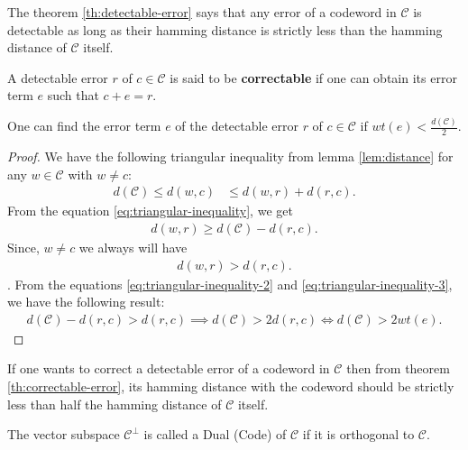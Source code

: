 The theorem \ref{th:detectable-error} says that any error of a codeword in $\mathcal{C}$ is 
detectable as long as their hamming distance is strictly less than the hamming distance of
$\mathcal{C}$ itself.

\begin{definition}
  A detectable error $r$ of $c\in\mathcal{C}$ is said to be \textbf{correctable} if one can obtain its 
  error term $e$ such that $c+e=r$.
\end{definition}

\begin{theorem}\cite{gallian2024contemporary}\label{th:correctable-error}
  One can find the error term $e$ of the detectable error $r$ of $c\in\mathcal{C}$ if 
  $wt(e)<\frac{d(\mathcal{C})}{2}$.
\end{theorem}
\begin{proof}
  We have the following triangular inequality from lemma \ref{lem:distance} for any $w\in\mathcal{C}$ with 
  $w\neq c$:
  \begin{align}\label{eq:triangular-inequality}
    d(\mathcal{C})\leq d(w,c)&\leq d(w,r)+d(r,c).
  \end{align}
  From the equation \eqref{eq:triangular-inequality}, we get 
  \begin{align}\label{eq:triangular-inequality-2}
    d(w,r)\geq d(\mathcal{C})-d(r,c).
  \end{align} 
  Since, $w\neq c$ we always will have 
  \begin{align}\label{eq:triangular-inequality-3}
    d(w,r)>d(r,c).
  \end{align}. 
  From the equations \eqref{eq:triangular-inequality-2} and \eqref{eq:triangular-inequality-3}, we have the 
  following result:
  \begin{align*}
    d(\mathcal{C})-d(r,c)>d(r,c) \implies d(\mathcal{C})>2d(r,c) \iff d(\mathcal{C})>2wt(e).
  \end{align*}
\end{proof}

If one wants to correct a detectable error of a codeword in $\mathcal{C}$ then from theorem 
\ref{th:correctable-error}, its hamming distance with the codeword should be strictly less than half 
the hamming distance of $\mathcal{C}$ itself.

\begin{definition}
  The vector subspace $\mathcal{C}^{\perp}$ is called a Dual (Code) of $\mathcal{C}$ if it is 
  orthogonal to $\mathcal{C}$.
\end{definition}

